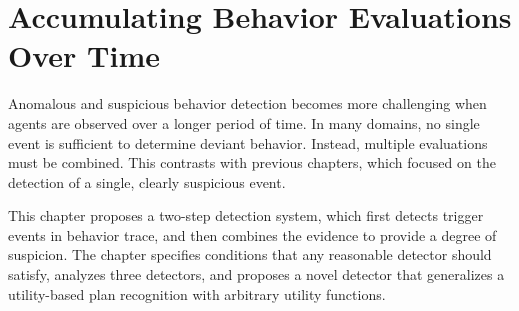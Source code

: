 
%
%
\chapter{Accumulating Behavior Evaluations Over Time}
\label{chap:accumulation}

Anomalous and suspicious behavior detection becomes more challenging when agents are observed over a longer period of time. In many domains, no single event is sufficient to determine deviant behavior. Instead, multiple evaluations must be combined. This contrasts with previous chapters, which focused on the detection of a single, clearly suspicious event. 

This chapter proposes a two-step detection system, which first detects trigger events in behavior trace, and then combines the evidence to provide a degree of suspicion. The chapter specifies conditions that any reasonable detector should satisfy, analyzes  three detectors, and proposes a novel detector that generalizes a utility-based plan recognition with arbitrary utility functions.






